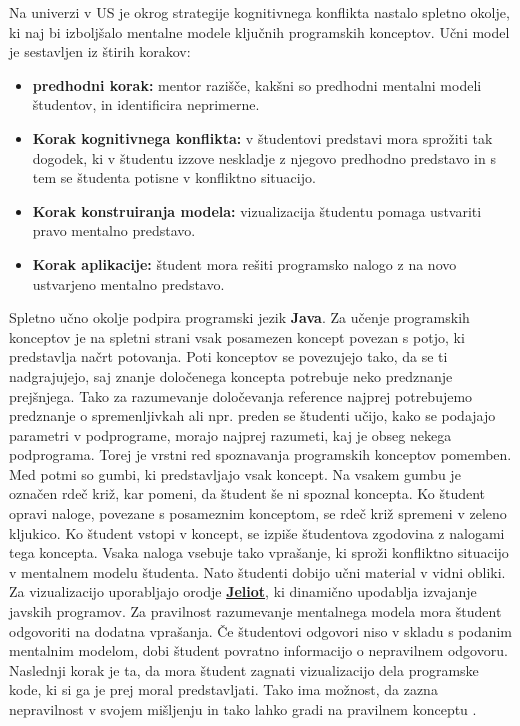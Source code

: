 
Na univerzi v US \cite{mentalModels} je okrog strategije kognitivnega
konflikta nastalo spletno okolje, ki naj bi izboljšalo mentalne modele
ključnih programskih konceptov. Učni model je sestavljen iz štirih
korakov:

\begin{itemize}
\item \textbf{predhodni korak:} mentor razišče, kakšni so predhodni
 mentalni modeli študentov, in identificira neprimerne.
\item \textbf{Korak kognitivnega konflikta:} v študentovi predstavi
  mora sprožiti tak dogodek, ki v študentu izzove neskladje z njegovo
  predhodno predstavo in s tem se študenta potisne v konfliktno
  situacijo.
\item \textbf{Korak konstruiranja modela:} vizualizacija študentu
  pomaga ustvariti pravo mentalno predstavo.
\item \textbf{Korak aplikacije:} študent mora rešiti programsko
  nalogo z na novo ustvarjeno mentalno predstavo.
\end{itemize}

Spletno učno okolje podpira programski jezik \textbf{Java}. Za učenje
programskih konceptov je na spletni strani vsak posamezen koncept
povezan s potjo, ki predstavlja načrt potovanja. Poti konceptov se
povezujejo tako, da se ti nadgrajujejo, saj znanje določenega koncepta
potrebuje neko predznanje prejšnjega. Tako za razumevanje določevanja
reference najprej potrebujemo predznanje o spremenljivkah ali
npr. preden se študenti učijo, kako se podajajo parametri v podprograme,
 morajo najprej razumeti, kaj je obseg nekega podprograma. Torej je
vrstni red spoznavanja programskih konceptov pomemben. Med potmi so
gumbi, ki predstavljajo vsak koncept. Na vsakem gumbu je označen rdeč
križ, kar pomeni, da študent še ni spoznal koncepta. Ko študent opravi
naloge, povezane s posameznim konceptom, se rdeč križ spremeni v zeleno
kljukico. Ko študent vstopi v koncept, se izpiše študentova zgodovina z
nalogami tega koncepta. Vsaka naloga vsebuje tako vprašanje, ki sproži
konfliktno situacijo v mentalnem modelu študenta. Nato študenti dobijo
učni material v vidni obliki. Za vizualizacijo uporabljajo orodje
\href{https://cs.joensuu.fi/jeliot/}{\textbf{Jeliot}}, ki dinamično
upodablja izvajanje javskih programov. Za pravilnost razumevanje
mentalnega modela mora študent odgovoriti na dodatna vprašanja. Če
študentovi odgovori niso v skladu s podanim mentalnim modelom, dobi
študent povratno informacijo o nepravilnem odgovoru. Naslednji korak
je ta, da mora študent  zagnati vizualizacijo dela programske kode, ki
si ga je prej moral predstavljati. Tako ima možnost, da zazna
nepravilnost v svojem mišljenju in tako lahko gradi na pravilnem
konceptu \cite{mentalModels}.

